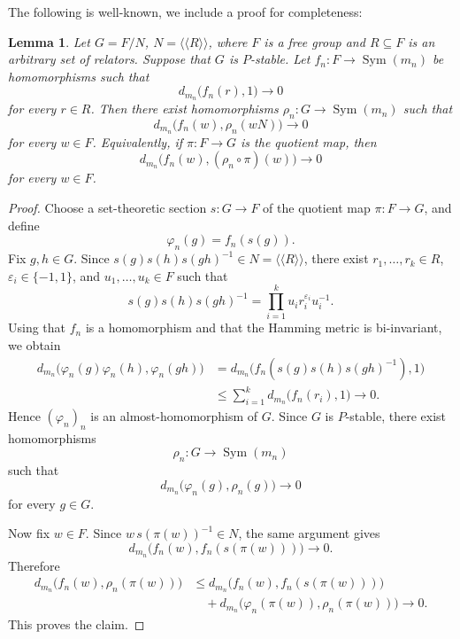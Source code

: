 \documentclass[a4paper,12pt]{amsart}
\theoremstyle{plain}
\newtheorem{lemma}[subsection]{{\bf Lemma}}
\theoremstyle{definition}
\newtheorem*{definition}{{\bf Definition}}
\theoremstyle{remark}
\numberwithin{equation}{subsection}
\DeclareMathOperator{\Sym}{Sym}
\begin{document}
The following is well-known, we include a proof for completeness:

\begin{lemma}
\label{lem:Pstabrel}
Let $G=F/N$, $N=\langle\!\langle R\rangle\!\rangle$,
where $F$ is a free group  and $R\subseteq F$ is an arbitrary set of relators. Suppose that $G$ is $P$-stable.
Let $f_n\colon F\to\Sym(m_n)$
be homomorphisms such that
$$d_{m_n}\bigl(f_n(r),1\bigr)\longrightarrow 0$$
for every $r\in R$.
Then there exist homomorphisms
$\rho_n\colon G\to\Sym(m_n)$
such that
$$d_{m_n}\bigl(f_n(w),\rho_n(wN)\bigr)\longrightarrow 0$$
for every $w\in F$.
Equivalently, if $\pi\colon F\to G$ is the quotient map, then
$$d_{m_n}\bigl(f_n(w),(\rho_n\circ\pi)(w)\bigr)\longrightarrow0$$
for every $w\in F$.
\end{lemma}

\begin{proof}
Choose a set-theoretic section
$s\colon G\to F$
of the quotient map $\pi\colon F\to G$, and define
$$\varphi_n(g)=f_n(s(g)).$$
Fix $g,h\in G$. Since
$s(g)s(h)s(gh)^{-1}\in N=\langle\!\langle R\rangle\!\rangle$,
there exist $r_1,\ldots,r_k\in R$, $\varepsilon_i\in\{-1,1\}$, and
$u_1,\ldots,u_k\in F$ such that
$$s(g)s(h)s(gh)^{-1}=
\prod_{i=1}^k u_i r_i^{\varepsilon_i}u_i^{-1}.$$
Using that $f_n$ is a homomorphism and that the Hamming metric is
bi-invariant, we obtain
$$
\begin{aligned}
d_{m_n}\bigl(\varphi_n(g)\varphi_n(h),\varphi_n(gh)\bigr)
&=
d_{m_n}\bigl(f_n(s(g)s(h)s(gh)^{-1}),1\bigr)\\
&\leq
\sum_{i=1}^k d_{m_n}\bigl(f_n(r_i),1\bigr)
\longrightarrow0.
\end{aligned}
$$
Hence $(\varphi_n)_n$ is an almost-homomorphism of $G$.
Since $G$ is $P$-stable, there exist homomorphisms
$$\rho_n\colon G\to\Sym(m_n)$$
such that
$$d_{m_n}\bigl(\varphi_n(g),\rho_n(g)\bigr)\longrightarrow0$$
for every $g\in G$.

Now fix $w\in F$. Since
$w\,s(\pi(w))^{-1}\in N$,
the same argument gives
$$d_{m_n}\bigl(f_n(w),f_n(s(\pi(w)))\bigr)\longrightarrow0.$$
Therefore
$$
\begin{aligned}
d_{m_n}\bigl(f_n(w),\rho_n(\pi(w))\bigr)
&\leq
d_{m_n}\bigl(f_n(w),f_n(s(\pi(w)))\bigr)\\
&\quad+
d_{m_n}\bigl(\varphi_n(\pi(w)),\rho_n(\pi(w))\bigr)
\longrightarrow0.
\end{aligned}
$$
This proves the claim.
\end{proof}

    
\end{document}
